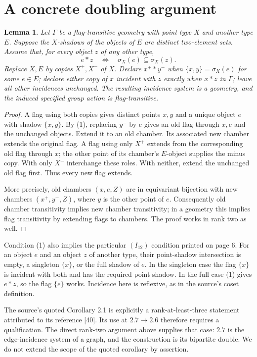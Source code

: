 \documentclass[11pt]{article}
\newtheorem{lemma}{Lemma}\newtheorem{theorem}{Theorem}
\begin{document}
\section{A concrete doubling argument}
\begin{lemma}
Let $\Gamma$ be a flag-transitive geometry with point type $X$ and
another type $E$. Suppose the $X$-shadows of the objects of $E$ are
distinct two-element sets. Assume that, for every object $z$ of any
other type,
\[
       e*z\quad\Longleftrightarrow\quad \sigma_X(e)\subseteq\sigma_X(z).
       \tag{1}
\]
Replace $X,E$ by copies $X^+,X^-$ of $X$. Declare $x^+*y^-$ when
$\{x,y\}=\sigma_X(e)$ for some $e\in E$; declare either copy of $x$
incident with $z$ exactly when $x*z$ in $\Gamma$; leave all other
incidences unchanged. The resulting incidence system is a geometry,
and the induced specified group action is flag-transitive.
\end{lemma}
\begin{proof}
A flag using both copies gives distinct points $x,y$ and a unique
object $e$ with shadow $\{x,y\}$. By (1), replacing $y^-$ by $e$
gives an old flag through $x,e$ and the unchanged objects. Extend it
to an old chamber. Its associated new chamber extends the original
flag. A flag using only $X^+$ extends from the corresponding old flag
through $x$; the other point of its chamber's $E$-object supplies the
minus copy. With only $X^-$ interchange these roles. With neither,
extend the unchanged old flag first. Thus every new flag extends.

More precisely, old chambers $(x,e,Z)$ are in equivariant bijection
with new chambers $(x^+,y^-,Z)$, where $y$ is the other point of $e$.
Consequently old chamber transitivity implies new chamber transitivity;
in a geometry this implies flag transitivity by extending flags to
chambers. The proof works in rank two as well.
\end{proof}
Condition (1) also implies the particular $(I_{12})$ condition printed
on page 6. For an object $e$ and an object $z$ of another type, their
point-shadow intersection is empty, a singleton $\{x\}$, or the full
shadow of $e$. In the singleton case the flag $\{x\}$ is incident
with both and has the required point shadow. In the full case (1)
gives $e*z$, so the flag $\{e\}$ works. Incidence here is reflexive,
as in the source's coset definition.

The source's quoted Corollary 2.1 is explicitly a rank-at-least-three
statement attributed to its reference [40]. Its use at $2.7\to2.6$
therefore requires a qualification. The direct rank-two argument above
supplies that case: $2.7$ is the edge-incidence system of a graph, and
the construction is its bipartite double. We do not extend the scope of
the quoted corollary by assertion.
\end{document}
